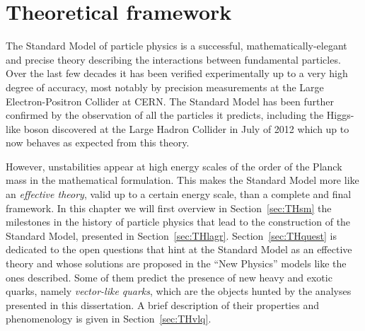 \clearpage{\pagestyle{empty}\cleardoublepage}

\chapter{Theoretical framework}\label{chap:TH}

\vspace{-2.5cm}



\vspace{0.5cm}

The Standard Model of particle physics is a
successful, mathematically-elegant and precise 
theory describing the interactions
between fundamental particles. 
Over the last few decades it has been verified experimentally
up to a very high degree of accuracy, most notably by precision measurements 
at the Large Electron-Positron Collider at CERN.
The Standard Model has been further confirmed 
by the observation of all the particles it 
predicts, including the Higgs-like boson discovered at the
Large Hadron Collider in July of 2012 which up to now 
behaves as expected from this theory.

However, unstabilities appear at high energy scales 
of the order of the Planck mass in the mathematical formulation.
This makes the Standard Model more like an {\it effective theory}, 
valid up to a certain energy scale, than a complete and final framework.
In this chapter we will first overview in Section~\ref{sec:THsm} the milestones
in the history of particle physics that lead to the construction
of the Standard Model, presented in Section~\ref{sec:THlagr}.
Section~\ref{sec:THquest} is dedicated to the
open questions that hint at the Standard Model 
as an effective theory and whose solutions are proposed
in the ``New Physics'' models like the ones described.
Some of them predict the presence of new heavy and exotic
quarks, namely {\it vector-like quarks}, which are
the objects hunted by the analyses presented in this dissertation.
A brief description of their properties and phenomenology is
given in Section~\ref{sec:THvlq}.






